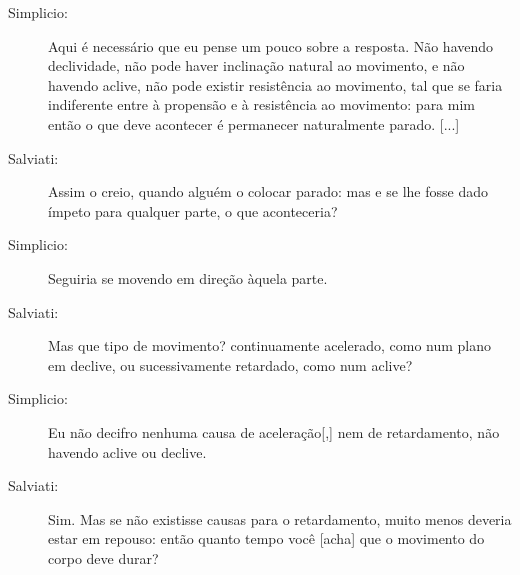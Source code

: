 \begin{description}
\item[Simplicio:] Aqui é necessário que eu pense um pouco sobre a resposta. Não havendo declividade, não pode haver inclinação natural ao movimento, e não havendo aclive, não pode existir resistência ao movimento, tal que se faria indiferente entre à propensão e à resistência ao movimento: para mim então o que deve acontecer é permanecer naturalmente parado. [...]

\item[Salviati:] Assim o creio, quando alguém o colocar parado: mas e se lhe fosse dado ímpeto para qualquer parte, o que aconteceria?

\item[Simplicio:] Seguiria se movendo em direção àquela parte.

\item[Salviati:] Mas que tipo de movimento? continuamente acelerado, como num plano em declive, ou sucessivamente retardado, como num aclive?

\item[Simplicio:] Eu não decifro nenhuma causa de aceleração[,] nem de retardamento, não havendo aclive ou declive.

\item[Salviati:] Sim. Mas se não existisse causas para o retardamento, muito menos deveria estar em repouso: então quanto tempo você [acha] que o movimento do corpo deve durar?


\end{description}
